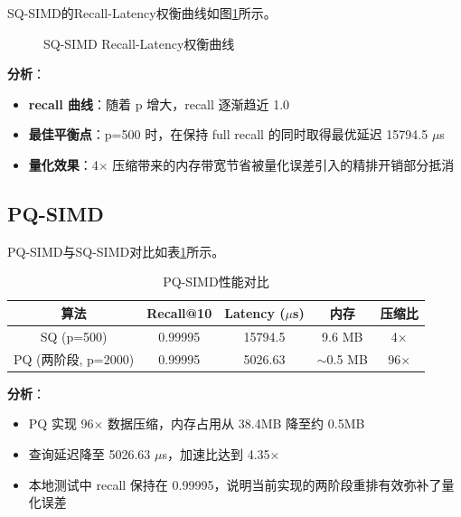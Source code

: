 \documentclass[a4paper]{article}
\begin{document}
SQ-SIMD的Recall-Latency权衡曲线如图\ref{fig:sq_tradeoff}所示。

\begin{figure}[H]
\centering
{}
\caption{SQ-SIMD Recall-Latency权衡曲线}
\label{fig:sq_tradeoff}
\end{figure}

\textbf{分析}：
\begin{itemize}
  \item \textbf{recall 曲线}：随着 p 增大，recall 逐渐趋近 1.0
  \item \textbf{最佳平衡点}：p=500 时，在保持 full recall 的同时取得最优延迟 15794.5 $\mu$s
  \item \textbf{量化效果}：4$\times$ 压缩带来的内存带宽节省被量化误差引入的精排开销部分抵消
\end{itemize}

\subsection{PQ-SIMD}

PQ-SIMD与SQ-SIMD对比如表\ref{table:pq_results}所示。

\begin{table}[!htbp]
  \centering
  \begin{tabular}{ccccc}
  \toprule  
  \textbf{算法} & \textbf{Recall@10} & \textbf{Latency ($\mu$s)} & \textbf{内存} & \textbf{压缩比} \\
  \midrule
  SQ (p=500) & 0.99995 & 15794.5 & 9.6 MB & 4$\times$ \\
  PQ (两阶段, p=2000) & 0.99995 & 5026.63 & $\sim$0.5 MB & 96$\times$ \\
  \bottomrule
  \end{tabular}
  \caption{PQ-SIMD性能对比}
  \label{table:pq_results}
\end{table}

\textbf{分析}：
\begin{itemize}
  \item PQ 实现 96$\times$ 数据压缩，内存占用从 38.4MB 降至约 0.5MB
  \item 查询延迟降至 5026.63 $\mu$s，加速比达到 4.35$\times$
  \item 本地测试中 recall 保持在 0.99995，说明当前实现的两阶段重排有效弥补了量化误差
\end{itemize}
\end{document}
